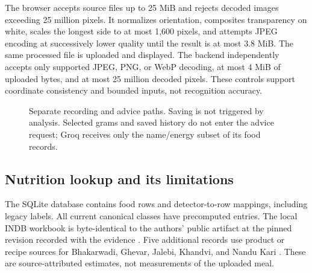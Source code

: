 \documentclass[12pt,journal,draftclsnofoot,onecolumn]{IEEEtran}
\begin{document}
The browser accepts source files up to 25 MiB and rejects decoded images exceeding 25 million pixels. It normalizes orientation, composites transparency on white, scales the longest side to at most 1,600 pixels, and attempts JPEG encoding at successively lower quality until the result is at most 3.8 MiB. The same processed file is uploaded and displayed. The backend independently accepts only supported JPEG, PNG, or WebP decoding, at most 4 MiB of uploaded bytes, and at most 25 million decoded pixels. These controls support coordinate consistency and bounded inputs, not recognition accuracy.

\begin{figure}[tbp]
\centering
{}
\caption{Separate recording and advice paths. Saving is not triggered by analysis. Selected grams and saved history do not enter the advice request; Groq receives only the name/energy subset of its food records.}
\label{fig:flow}
\end{figure}

\subsection{Nutrition lookup and its limitations}
The SQLite database contains \NutritionRows{} food rows and \MappingRows{} detector-to-row mappings, including legacy labels. All \AuditClasses{} current canonical classes have precomputed entries. The local INDB workbook is byte-identical to the authors' public artifact at the pinned revision recorded with the evidence \cite{indb_artifact_2024}. Five additional records use product or recipe sources for Bhakarwadi, Ghevar, Jalebi, Khandvi, and Nandu Kari \cite{fatsecret_bhakarwadi_2026,clearcals_ghevar_2026,clearcals_jalebi_2026,clearcals_khandvi_2026,clearcals_nandu_kari_2026}. These are source-attributed estimates, not measurements of the uploaded meal.
\end{document}
